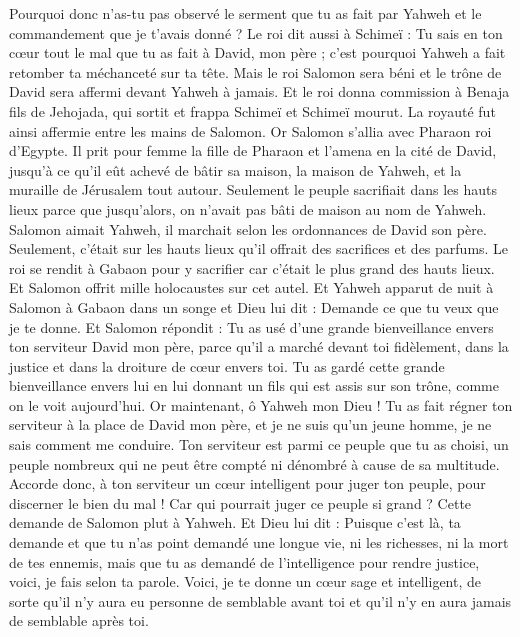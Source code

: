 \begin{multicols}{2}
Pourquoi donc n'as-tu pas observé le serment que tu as fait par Yahweh et le commandement que je t'avais donné ?
Le roi dit aussi à Schimeï : Tu sais en ton cœur tout le mal que tu as fait à David, mon père ; c'est pourquoi Yahweh a fait retomber ta méchanceté sur ta tête.
Mais le roi Salomon sera béni et le trône de David sera affermi devant Yahweh à jamais.
Et le roi donna commission à Benaja fils de Jehojada, qui sortit et frappa Schimeï et Schimeï mourut. La royauté fut ainsi affermie entre les mains de Salomon.
\VerseOne{}Or Salomon s'allia avec Pharaon roi d'Egypte. Il prit pour femme la fille de Pharaon et l'amena en la cité de David, jusqu'à ce qu'il eût achevé de bâtir sa maison, la maison de Yahweh, et la muraille de Jérusalem tout autour.
Seulement le peuple sacrifiait dans les hauts lieux parce que jusqu'alors, on n'avait pas bâti de maison au nom de Yahweh.
Salomon aimait Yahweh, il marchait selon les ordonnances de David son père. Seulement, c'était sur les hauts lieux qu'il offrait des sacrifices et des parfums.
Le roi se rendit à Gabaon pour y sacrifier car c'était le plus grand des hauts lieux. Et Salomon offrit mille holocaustes sur cet autel.
Et Yahweh apparut de nuit à Salomon à Gabaon dans un songe et Dieu lui dit : Demande ce que tu veux que je te donne.
Et Salomon répondit : Tu as usé d'une grande bienveillance envers ton serviteur David mon père, parce qu'il a marché devant toi fidèlement, dans la justice et dans la droiture de cœur envers toi. Tu as gardé cette grande bienveillance envers lui en lui donnant un fils qui est assis sur son trône, comme on le voit aujourd'hui.
Or maintenant, ô Yahweh mon Dieu ! Tu as fait régner ton serviteur à la place de David mon père, et je ne suis qu'un jeune homme, je ne sais comment me conduire.
Ton serviteur est parmi ce peuple que tu as choisi, un peuple nombreux qui ne peut être compté ni dénombré à cause de sa multitude.
Accorde donc, à ton serviteur un cœur intelligent pour juger ton peuple, pour discerner le bien du mal ! Car qui pourrait juger ce peuple si grand ?
Cette demande de Salomon plut à Yahweh.
Et Dieu lui dit : Puisque c'est là, ta demande et que tu n'as point demandé une longue vie, ni les richesses, ni la mort de tes ennemis, mais que tu as demandé de l'intelligence pour rendre justice,
voici, je fais selon ta parole. Voici, je te donne un cœur sage et intelligent, de sorte qu'il n'y aura eu personne de semblable avant toi et qu'il n'y en aura jamais de semblable après toi.

\end{multicols}
